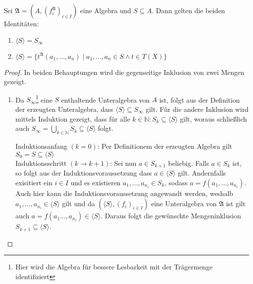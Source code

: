 \begin{proposition}
    Sei $\mathfrak{A}=(A,(f^\mathfrak{A}_i)_{i\in I})$ eine Algebra und $S\subseteq A$. Dann gelten die beiden Identitäten:
    \begin{enumerate}
        \item $\langle S\rangle=S_\infty$
        \item $\langle S\rangle=\{t^\mathfrak{A}(a_1,\ldots,a_n) \mid a_1,\ldots,a_n\in S\land t\in T(X)\}$
    \end{enumerate}
\end{proposition}
\begin{proof} In beiden Behauptungen wird die gegenseitige Inklusion von zwei Mengen gezeigt.
    \begin{enumerate}
        \item Da $S_\infty$\footnote{Hier wird die Algebra für bessere Lesbarkeit mit der Trägermenge identifiziert} eine $S$ enthaltende Unteralgebra von $A$ ist, folgt aus der Definition der
        erzeugten Unteralgebra, dass $\langle S\rangle\subseteq S_\infty$ gilt.
        Für die andere Inklusion wird mittels Induktion gezeigt, dass für alle $k\in\mathbb{N}:S_k\subseteq \langle S\rangle$ gilt,
        woraus schließlich auch $S_\infty=\bigcup_{k\in\mathbb{N}}S_k\subseteq \langle S\rangle$ folgt.

        Induktionsanfang $(k=0)$: Per Definitionem der erzeugten Algebra gilt $S_0=S\subseteq \langle S\rangle$\\
        Induktionsschritt $(k\to k+1)$: Sei nun $a\in S_{k+1}$ beliebig. Falls $a\in S_k$ ist, so folgt aus
        der Induktionsvoraussetzung dass $a\in \langle S\rangle$ gilt. Andernfalls exisitiert ein $i\in I$ und
        es existieren $a_1,\ldots,a_{n_i}\in S_{k}$, sodass $a=f(a_1,\ldots,a_{n_i})$. Auch hier kann die Induktionsvoraussetzung
        angewandt werden, weshalb $a_1,\ldots,a_{n_i}\in \langle S\rangle$ gilt und da $(\langle S\rangle,(f_i)_{i\in I})$ eine Unteralgebra
        von $\mathfrak{A}$ ist gilt auch $a=f(a_1\ldots,a_{n_i})\in\langle S\rangle$. Daraus folgt die gewünschte Mengeninklusion
        $S_{k+1}\subseteq \langle S\rangle$.


\end{enumerate}
\end{proof}
